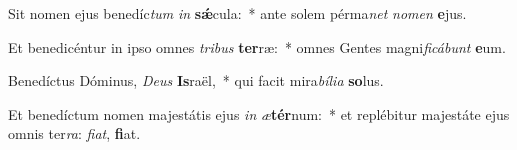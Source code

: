 \item Sit nomen ejus benedíc\textit{tum} \textit{in} \textbf{sǽ}cula:~* ante solem pérma\textit{net} \textit{no}\textit{men} \textbf{e}jus.
\item Et benedicéntur in ipso omnes \textit{tri}\textit{bus} \textbf{ter}ræ:~* omnes Gentes magni\textit{fi}\textit{cá}\textit{bunt} \textbf{e}um.
\item Benedíctus Dóminus, \textit{De}\textit{us} \textbf{Is}raël,~* qui facit mira\textit{bí}\textit{li}\textit{a} \textbf{so}lus.
\item Et benedíctum nomen majestátis ejus \textit{in} \textit{æ}\textbf{tér}num:~* et replébitur majestáte ejus omnis ter\textit{ra}: \textit{fi}\textit{at}, \textbf{fi}at.
